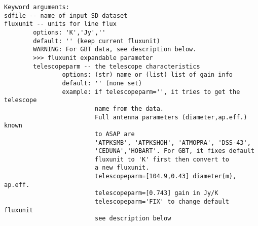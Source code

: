 \begin{verbatim}
Keyword arguments:
sdfile -- name of input SD dataset
fluxunit -- units for line flux
        options: 'K','Jy',''
        default: '' (keep current fluxunit)
        WARNING: For GBT data, see description below.
        >>> fluxunit expandable parameter
        telescopeparm -- the telescope characteristics
                options: (str) name or (list) list of gain info
                default: '' (none set)
                example: if telescopeparm='', it tries to get the telescope
                         name from the data.
                         Full antenna parameters (diameter,ap.eff.) known
                         to ASAP are
                         'ATPKSMB', 'ATPKSHOH', 'ATMOPRA', 'DSS-43',
                         'CEDUNA','HOBART'. For GBT, it fixes default 
                         fluxunit to 'K' first then convert to 
                         a new fluxunit.
                         telescopeparm=[104.9,0.43] diameter(m), ap.eff.
                         telescopeparm=[0.743] gain in Jy/K
                         telescopeparm='FIX' to change default fluxunit
                         see description below


\end{verbatim}
